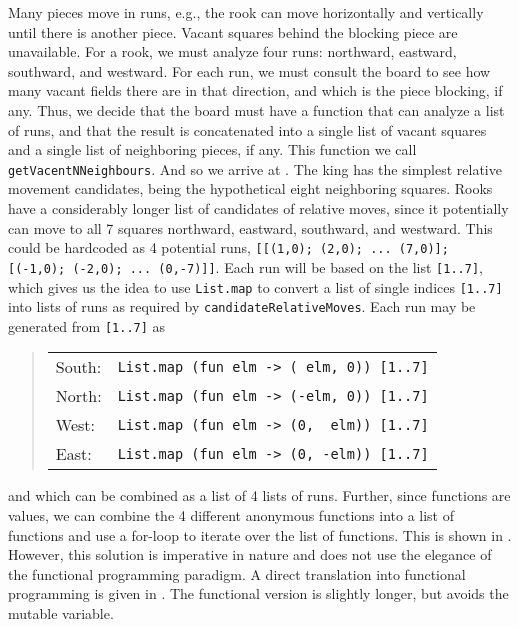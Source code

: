 \documentclass[fsharpnotes.tex]{subfiles}
\begin{document}
Many pieces move in runs, e.g., the rook can move horizontally and vertically until there is another piece. Vacant squares behind the blocking piece are unavailable. For a rook, we must analyze four runs: northward, eastward, southward, and westward. For each run, we must consult the board to see how many vacant fields there are in that direction, and which is the piece blocking, if any. Thus, we decide that the board must have a function that can analyze a list of runs, and that the result is concatenated into a single list of vacant squares and a single list of neighboring pieces, if any. This function we call \lstinline{getVacentNNeighbours}. And so we arrive at .
%
%
The king has the simplest relative movement candidates, being the hypothetical eight neighboring squares. Rooks have a considerably longer list of candidates of relative moves, since it potentially can move to all 7 squares northward, eastward, southward, and westward. This could be hardcoded as 4 potential runs, \lstinline{[[(1,0); (2,0); ... (7,0)]; [(-1,0); (-2,0); ... (0,-7)]]}. Each run will be based on the list \lstinline{[1..7]}, which gives us the idea to use \lstinline{List.map} to convert a list of single indices \lstinline{[1..7]} into lists of runs as required by \lstinline{candidateRelativeMoves}. Each run may be generated from \lstinline{[1..7]} as
\begin{quote}
  \begin{tabular}{ll}
    South:& \lstinline!List.map (fun elm -> ( elm, 0)) [1..7]! \\
    North:& \lstinline!List.map (fun elm -> (-elm, 0)) [1..7]!  \\
    West:& \lstinline!List.map (fun elm -> (0,  elm)) [1..7]! \\
    East:& \lstinline!List.map (fun elm -> (0, -elm)) [1..7]! 
  \end{tabular}
\end{quote}
and which can be combined as a list of 4 lists of runs. Further, since functions are values, we can combine the 4 different anonymous functions into a list of functions and use a for-loop to iterate over the list of functions. This is shown in .
%
%
However, this solution is imperative in nature and does not use the elegance of the functional programming paradigm. A direct translation into functional programming is given in .
%
%
The functional version is slightly longer, but avoids the mutable variable.
\end{document}
